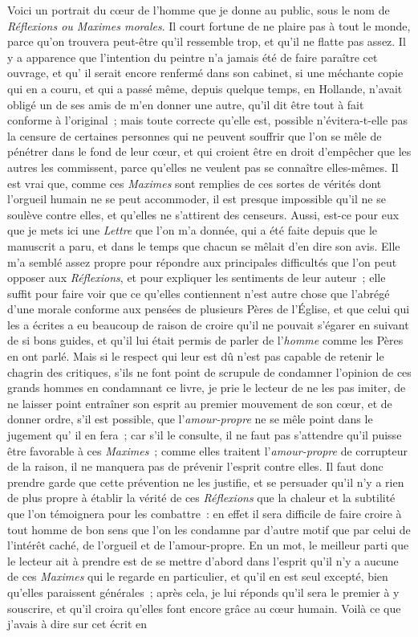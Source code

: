 \documentclass[french,twoside]{book} %
\begin{document}
\noindent Voici un portrait du cœur de l’homme que je donne au public, sous le nom de {\itshape Réflexions ou Maximes morales}. Il court fortune de ne plaire pas à tout le monde, parce qu’on trouvera peut-être qu’il ressemble trop, et qu’il ne flatte pas assez. Il y a apparence que l’intention du peintre n’a jamais été de faire paraître cet ouvrage, et qu’ il serait encore renfermé dans son cabinet, si une méchante copie qui en a couru, et qui a passé même, depuis quelque temps, en Hollande, n’avait obligé un de ses amis de m’en donner une autre, qu’il dit être tout à fait conforme à l’original ; mais toute correcte qu’elle est, possible n’évitera-t-elle pas la censure de certaines personnes qui ne peuvent souffrir que l’on se mêle de pénétrer dans le fond de leur cœur, et qui croient être en droit d’empêcher que les autres les commissent, parce qu’elles ne veulent pas se connaître elles-mêmes. Il est vrai que, comme ces {\itshape Maximes} sont remplies de ces sortes de vérités dont l’orgueil humain ne se peut accommoder, il est presque impossible qu’il ne se soulève contre elles, et qu’elles ne s’attirent des censeurs. Aussi, est-ce pour eux que je mets ici une {\itshape Lettre} que l’on m’a donnée, qui a été faite depuis que le manuscrit a paru, et dans le temps que chacun se mêlait d’en dire son avis. Elle m’a semblé assez propre pour répondre aux principales difficultés que l’on peut opposer aux {\itshape Réflexions}, et pour expliquer les sentiments de leur auteur ; elle suffit pour faire voir que ce qu’elles contiennent n’est autre chose que l’abrégé d’une morale conforme aux pensées de plusieurs Pères de l’Église, et que celui qui les a écrites a eu beaucoup de raison de croire qu’il ne pouvait s’égarer en suivant de si bons guides, et qu’il lui était permis de parler de l’{\itshape homme} comme les Pères en ont parlé. Mais si le respect qui leur est dû n’est pas capable de retenir le chagrin des critiques, s’ils ne font point de scrupule de condamner l’opinion de ces grands hommes en condamnant ce livre, je prie le lecteur de ne les pas imiter, de ne laisser point entraîner son esprit au premier mouvement de son cœur, et de donner ordre, s’il est possible, que l’{\itshape amour-propre} ne se mêle point dans le jugement qu’ il en fera ; car s’il le consulte, il ne faut pas s’attendre qu’il puisse être favorable à ces {\itshape Maximes} ; comme elles traitent l’{\itshape amour-propre} de corrupteur de la raison, il ne manquera pas de prévenir l’esprit contre elles. Il faut donc prendre garde que cette prévention ne les justifie, et se persuader qu’il n’y a rien de plus propre à établir la vérité de ces {\itshape Réflexions} que la chaleur et la subtilité que l’on témoignera pour les combattre : en effet il sera difficile de faire croire à tout homme de bon sens que l’on les condamne par d’autre motif que par celui de l’intérêt caché, de l’orgueil et de l’amour-propre. En un mot, le meilleur parti que le lecteur ait à prendre est de se mettre d’abord dans l’esprit qu’il n’y a aucune de ces {\itshape Maximes} qui le regarde en particulier, et qu’il en est seul excepté, bien qu’elles paraissent générales ; après cela, je lui réponds qu’il sera le premier à y souscrire, et qu’il croira qu’elles font encore grâce au cœur humain. Voilà ce que j’avais à dire sur cet écrit en 
\end{document}
